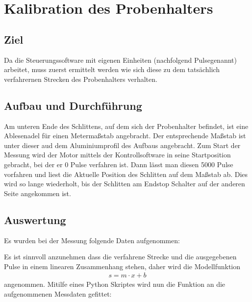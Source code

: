 \documentclass[12pt,twoside,a4paper]{scrartcl}
\begin{document}
	\section{Kalibration des Probenhalters}

		\subsection{Ziel}
			Da die Steuerungssoftware mit eigenen Einheiten (nachfolgend \glqq Pulse\grqq genannt) arbeitet, muss zuerst ermittelt werden wie sich diese zu dem tatsächlich verfahrernen Strecken des Probenhalters verhalten.

		\subsection{Aufbau und Durchführung}
			Am unteren Ende des Schlittens, auf dem sich der Probenhalter befindet, ist eine Ablesenadel für einen Metermaßstab angebracht. Der entsprechende Maßstab ist unter dieser aud dem Aluminiumprofil des Aufbaus angebracht. Zum Start der Messung wird der Motor mittels der Kontrollsoftware in seine Startposition gebracht, bei der er 0 Pulse verfahren ist. Dann lässt man diesen 5000 Pulse vorfahren und liest die Aktuelle Position des Schlitten auf dem Maßstab ab. Dies wird so lange wiederholt, bis der Schlitten am Endstop Schalter auf der anderen Seite angekommen ist.

		\subsection{Auswertung}

			Es wurden bei der Messung folgende Daten aufgenommen:

				


			Es ist sinnvoll anzunehmen dass die verfahrene Strecke und die ausgegebenen Pulse in einem linearen Zusammenhang stehen, daher wird die Modellfunktion
			\begin{align*}
					s = m \cdot x + b
			\end{align*}
			angenommen.
			Mitilfe eines Python Skriptes wird nun die Funktion an die aufgenommenen Messdaten gefittet:
\end{document}
